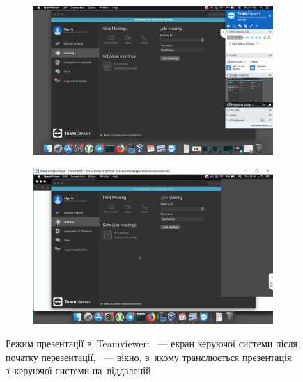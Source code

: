 \documentclass[
	a4paper,
	oneside,
	BCOR = 10mm,
	DIV = 12,
	12pt,
	headings = normal,
]{scrartcl}
\newlength{\gridunitwidth}
\begin{document}
			\begin{figure}[!htbp]
				\centering
				\begin{subfigure}[b]{8\gridunitwidth}
					\includegraphics[width = \columnwidth]{./assets/p03-02.png}
					\caption{}
					\label{subfig:02-teamviewer-meeting-01}
				\end{subfigure}
				\begin{subfigure}[b]{8\gridunitwidth}
					\includegraphics[width = \columnwidth]{./assets/p03-03.jpeg}
					\caption{}
					\label{subfig:02-teamviewer-meeting-02}
				\end{subfigure}
				\caption{Режим презентації в~\textenglish{Teamviewer}: ~— екран керуючої системи після початку перезентації, ~— вікно, в~якому транслюється презентація з~керуючої системи на~віддаленій}
				\label{fig:02-teamviewer-meeting}
			\end{figure}
\end{document}

